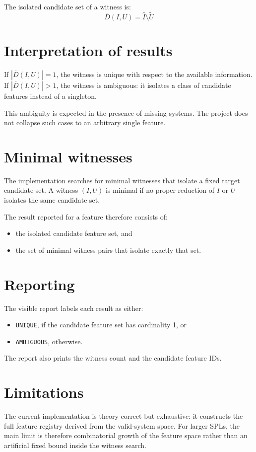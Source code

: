 \documentclass[english,10pt,a4paper,onecolumn]{article}
\begin{document}
The isolated candidate set of a witness is:
\[
\overline{D}(I, U) = \widehat{I} \setminus \widetilde{U}
\]

\section{Interpretation of results}
If $|\overline{D}(I, U)| = 1$, the witness is unique with respect to the
available information. If $|\overline{D}(I, U)| > 1$, the witness is
ambiguous: it isolates a class of candidate features instead of a singleton.

This ambiguity is expected in the presence of missing systems. The project does
not collapse such cases to an arbitrary single feature.

\section{Minimal witnesses}
The implementation searches for minimal witnesses that isolate a fixed target
candidate set. A witness $(I, U)$ is minimal if no proper reduction of $I$ or
$U$ isolates the same candidate set.

The result reported for a feature therefore consists of:
\begin{itemize}[leftmargin=*]
\item the isolated candidate feature set, and
\item the set of minimal witness pairs that isolate exactly that set.
\end{itemize}

\section{Reporting}
The visible report labels each result as either:
\begin{itemize}[leftmargin=*]
\item \texttt{UNIQUE}, if the candidate feature set has cardinality 1, or
\item \texttt{AMBIGUOUS}, otherwise.
\end{itemize}

The report also prints the witness count and the candidate feature IDs.

\section{Limitations}
The current implementation is theory-correct but exhaustive: it constructs the
full feature registry derived from the valid-system space. For larger SPLs, the
main limit is therefore combinatorial growth of the feature space rather than
an artificial fixed bound inside the witness search.
\end{document}
